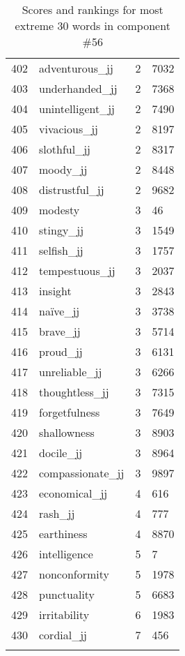 \begin{longtable}[!htbp]{| rlr@{.}l |}
    402 & adventurous\_jj & 2 & 7032 \\
    403 & underhanded\_jj & 2 & 7368 \\
    404 & unintelligent\_jj & 2 & 7490 \\
    405 & vivacious\_jj & 2 & 8197 \\
    406 & slothful\_jj & 2 & 8317 \\
    407 & moody\_jj & 2 & 8448 \\
    408 & distrustful\_jj & 2 & 9682 \\
    409 & modesty & 3 & 46 \\
    410 & stingy\_jj & 3 & 1549 \\
    411 & selfish\_jj & 3 & 1757 \\
    412 & tempestuous\_jj & 3 & 2037 \\
    413 & insight & 3 & 2843 \\
    414 & naïve\_jj & 3 & 3738 \\
    415 & brave\_jj & 3 & 5714 \\
    416 & proud\_jj & 3 & 6131 \\
    417 & unreliable\_jj & 3 & 6266 \\
    418 & thoughtless\_jj & 3 & 7315 \\
    419 & forgetfulness & 3 & 7649 \\
    420 & shallowness & 3 & 8903 \\
    421 & docile\_jj & 3 & 8964 \\
    422 & compassionate\_jj & 3 & 9897 \\
    423 & economical\_jj & 4 & 616 \\
    424 & rash\_jj & 4 & 777 \\
    425 & earthiness & 4 & 8870 \\
    426 & intelligence & 5 & 7 \\
    427 & nonconformity & 5 & 1978 \\
    428 & punctuality & 5 & 6683 \\
    429 & irritability & 6 & 1983 \\
    430 & cordial\_jj & 7 & 456 \\
    \hline
    \caption{Scores and rankings for most extreme 30 words in component \#56} \\
\end{longtable}
